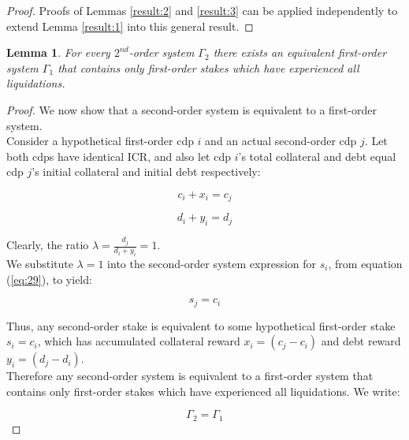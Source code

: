 \documentclass[reqno]{article}
\newtheorem{lemma}[theorem]{Lemma}
\begin{document}
\begin{proof}
  Proofs of Lemmas \ref{result:2} and \ref{result:3} can be applied independently to extend Lemma \ref{result:1} into this general result.
\end{proof}

\begin{lemma} \label{result:5}
  For every $2^{nd}$-order system $\Gamma_2$ there exists an equivalent first-order system $\Gamma_1$ that contains only first-order stakes which have experienced all liquidations.
\end{lemma}

\begin{proof}
We now show that a second-order system is equivalent to a first-order system.\\

Consider a hypothetical first-order cdp $i$ and an actual second-order cdp $j$. Let both cdps have identical ICR, and also let cdp $i$’s total collateral and debt equal cdp $j$’s initial collateral and initial debt respectively:

\begin{equation} 
    c_i+x_i=c_j
\end{equation}

\begin{equation} 
    d_i+y_i=d_j
\end{equation}

\bigskip
Clearly, the ratio  $\lambda = \frac{d_j}{d_i+y_i} = 1$.\\

We substitute $\lambda=1$ into the second-order system expression for $s_i$, from equation (\ref{eq:29}), to yield:

\begin{equation} 
    s_j=c_i
\end{equation}

\bigskip
Thus, any second-order stake is equivalent to some hypothetical first-order stake $s_i=c_i$, which has accumulated collateral reward $x_i=(c_j-c_i)$ and debt reward $y_i=(d_j-d_i)$.\\

Therefore any second-order system is equivalent to a first-order system that contains only first-order stakes which have experienced all liquidations. We write:

\begin{equation} 
    \Gamma_2=\Gamma_1
\end{equation}
\end{proof}
\end{document}
